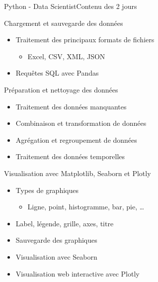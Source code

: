 \documentclass{beamer}
\begin{document}
\begin{frame}{Python - Data Scientist}{Contenu des 2 jours}
\begin{tiny}
\begin{multicols}{3}
\begin{itemize}
{                    \item Chargement et sauvegarde des données
                    \begin{itemize}
                        \tiny
                        \item Traitement des principaux formats de fichiers
                        \begin{itemize}
                            \tiny
                            \item Excel, CSV, XML, JSON
                        \end{itemize}
                        \item Requêtes SQL avec Pandas
                    \end{itemize}

                    \item Préparation et nettoyage des données
                    \begin{itemize}
                        \tiny
                        \item Traitement des données manquantes
                        \item Combinaison et transformation de données
                        \item Agrégation et regroupement de données
                        \item Traitement des données temporelles
                    \end{itemize}

                    \item Visualisation avec Matplotlib, Seaborn et Plotly
                    \begin{itemize}
                        \tiny
                        \item Types de graphiques
                        \begin{itemize}
                            \tiny
                            \item Ligne, point, histogramme, bar, pie, \ldots{}
                        \end{itemize}
                        \item Label, légende, grille, axes, titre
                        \item Sauvegarde des graphiques
                        \item Visualisation avec Seaborn
                        \item Visualisation web interactive avec Plotly
                    \end{itemize}

}
\end{itemize}
\end{multicols}
\end{tiny}
\end{frame}
\end{document}
